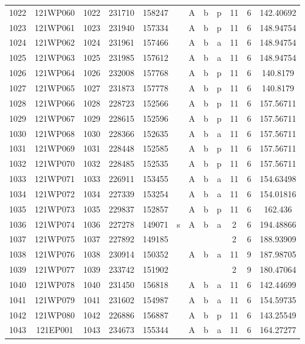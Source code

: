 \begin{tabular}{|*{12}{c|}}
1022 & 121WP060 & 1022 & 231710 & 158247 &  & A & b & p & 11 & 6 & 142.40692 \\ 
1023 & 121WP061 & 1023 & 231940 & 157334 &  & A & b & p & 11 & 6 & 148.94754 \\ 
1024 & 121WP062 & 1024 & 231961 & 157466 &  & A & b & a & 11 & 6 & 148.94754 \\ 
1025 & 121WP063 & 1025 & 231985 & 157612 &  & A & b & a & 11 & 6 & 148.94754 \\ 
1026 & 121WP064 & 1026 & 232008 & 157768 &  & A & b & p & 11 & 6 & 140.8179 \\ 
1027 & 121WP065 & 1027 & 231873 & 157778 &  & A & b & p & 11 & 6 & 140.8179 \\ 
1028 & 121WP066 & 1028 & 228723 & 152566 &  & A & b & p & 11 & 6 & 157.56711 \\ 
1029 & 121WP067 & 1029 & 228615 & 152596 &  & A & b & p & 11 & 6 & 157.56711 \\ 
1030 & 121WP068 & 1030 & 228366 & 152635 &  & A & b & a & 11 & 6 & 157.56711 \\ 
1031 & 121WP069 & 1031 & 228448 & 152585 &  & A & b & p & 11 & 6 & 157.56711 \\ 
1032 & 121WP070 & 1032 & 228485 & 152535 &  & A & b & p & 11 & 6 & 157.56711 \\ 
1033 & 121WP071 & 1033 & 226911 & 153455 &  & A & b & a & 11 & 6 & 154.63498 \\ 
1034 & 121WP072 & 1034 & 227339 & 153254 &  & A & b & a & 11 & 6 & 154.01816 \\ 
1035 & 121WP073 & 1035 & 229837 & 152857 &  & A & b & p & 11 & 6 & 162.436 \\ 
1036 & 121WP074 & 1036 & 227278 & 149071 & s & A & b & a & 2 & 6 & 194.48866 \\ 
1037 & 121WP075 & 1037 & 227892 & 149185 &  &  &  &  & 2 & 6 & 188.93909 \\ 
1038 & 121WP076 & 1038 & 230914 & 150352 &  & A & b & a & 11 & 9 & 187.98705 \\ 
1039 & 121WP077 & 1039 & 233742 & 151902 &  &  &  &  & 2 & 9 & 180.47064 \\ 
1040 & 121WP078 & 1040 & 231450 & 156818 &  & A & b & a & 11 & 6 & 142.44699 \\ 
1041 & 121WP079 & 1041 & 231602 & 154987 &  & A & b & a & 11 & 6 & 154.59735 \\ 
1042 & 121WP080 & 1042 & 226886 & 156887 &  & A & b & p & 11 & 6 & 143.25549 \\ 
1043 & 121EP001 & 1043 & 234673 & 155344 &  & A & b & a & 11 & 6 & 164.27277 \\ 

\end{tabular}
